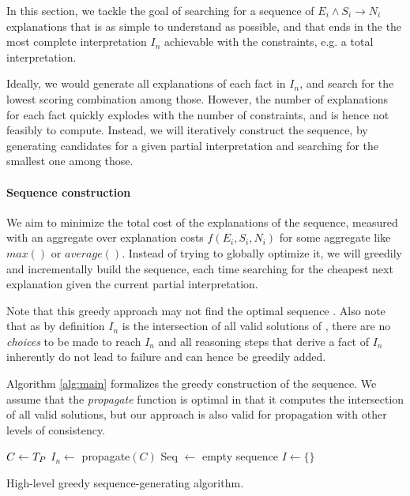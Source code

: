 In this section, we tackle the goal of searching for a sequence of $E_i \wedge S_i \rightarrow N_i$ explanations that is as simple to understand as possible, and that ends in the the most complete interpretation $I_n$ achievable with the constraints, e.g. a total interpretation.

Ideally, we would generate all explanations of each fact in $I_n$, and search for the lowest scoring combination among those. However, the number of explanations for each fact quickly explodes with the number of constraints, and is hence not feasibly to compute. Instead, we will iteratively construct the sequence, by generating candidates for a given partial interpretation and searching for the smallest one among those.

\paragraph{Sequence construction}
We aim to minimize the total cost of the explanations of the sequence, measured with an aggregate over explanation costs $f(E_i, S_i, N_i)$ for some aggregate like $max()$ or $average()$. Instead of trying to globally optimize it, we will greedily and incrementally build the sequence, each time searching for the cheapest next explanation given the current partial interpretation. 

Note that this greedy approach may not find the optimal sequence . Also note that as by definition $I_n$ is the intersection of all valid solutions of \allconstraints, there are no \textit{choices} to be made to reach $I_n$ and all reasoning steps that derive a fact of $I_n$ inherently do not lead to failure and can hence be greedily added. 

Algorithm \ref{alg:main} formalizes the greedy construction of the sequence. We assume that the \textit{propagate} function is optimal in that it computes the intersection of all valid solutions, but our approach is also valid for propagation with other levels of consistency.

\begin{algorithm}
$C \gets T_P$\;
$I_n \gets$ propagate$(C)$\;
Seq $\gets$ empty sequence\;
$I \gets \{\}$\;
\caption{High-level greedy sequence-generating algorithm.}
\label{alg:main}
\end{algorithm}

